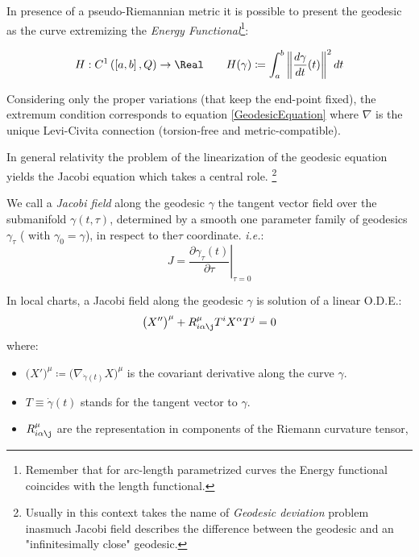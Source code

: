 \documentclass[Main]{subfiles}
\begin{document}
	\vspace{4mm}
	In presence of a pseudo-Riemannian metric it is possible to present the geodesic %
	as the curve extremizing the \emph{Energy Functional}\footnote{Remember that for arc-length parametrized curves the Energy functional coincides with the length functional.\cite[Lemma $1.4.2$ ]{Jost2005}}:
	\begin{definition}
  	\begin{equation}\label{EnergyFunctional}
  		H: C^1\left(\left[a,b\right],Q\right) \rightarrow \Real \qquad
 		H(\gamma) \coloneqq \int_a^b \left\Vert \frac{d \gamma}{dt} (t)\right\Vert^2 dt
 	\end{equation}
\end{definition} 	
	Considering only the proper variations (that keep the end-point fixed), the extremum condition corresponds to equation \ref{GeodesicEquation} where $\nabla$ is the unique Levi-Civita connection (torsion-free and metric-compatible).

	\vspace{4mm}
	In general relativity the problem of the 
	linearization of the geodesic equation yields the Jacobi equation which takes
	 a central role. \footnote{Usually in this context takes the name of \emph{Geodesic deviation} problem\cite[pag. 46]{Wald1984} inasmuch Jacobi field describes the difference between the geodesic and an "infinitesimally close" geodesic.}
	
	\begin{definition}
	We call a \emph{Jacobi field} along the geodesic $\gamma$ the tangent vector field over the submanifold $\gamma(t,\tau)$, determined by  a smooth one parameter family of geodesics$ \gamma_\tau$ ( with $\gamma_0=\gamma$), in respect to the$\tau$ coordinate. \textit{i.e.}:
	\begin{displaymath}
	 J = \left. \frac{\partial \gamma_\tau (t)}{\partial \tau}\right\rvert_{\tau=0}
	\end{displaymath}
	\end{definition}
	
		In local charts, a Jacobi field along the geodesic $\gamma$ is solution of a linear O.D.E.:
		\begin{equation}\label{JacobiEquationComponents}
			\big( X''\big)^\mu + R^\mu_{i \alpha \j} T^i X^\alpha T^j =0
		\end{equation}
		where:
		\begin{itemize}
			\item $\big(X'\big)^\mu \coloneqq \big( \nabla_{\dot{\gamma}(t)} X\big)^\mu$ is the covariant derivative along the curve $\gamma$.
			\item $T \equiv \dot{\gamma}(t)$ stands for the tangent vector to $\gamma$.
			\item $R^\mu_{i \alpha \j}$ are the representation in components of the Riemann curvature tensor,
		\end{itemize}
\end{document}
